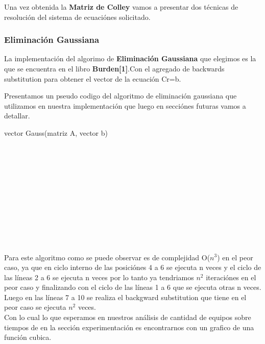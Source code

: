 Una vez obtenida la \textbf{Matriz de Colley} vamos a  presentar dos técnicas de resoluci\'on del sistema de ecuaci\'ones solicitado.\\

\subsubsection{Eliminación Gaussiana}
La implementación del algorimo de \textbf{Eliminación Gaussiana} que elegimos es la que se encuentra en el libro \textbf{Burden[1]}.Con el agregado de backwards substitution para 
obtener el vector de la ecuaci\'on Cr=b.

Presentamos un pseudo codigo del algoritmo de eliminaci\'on gaussiana que utilizamos en nuestra implementaci\'on que luego en secci\'ones futuras vamos a detallar.

\begin{algorithm}
    \begin{algorithmic}[1]\parskip=2mm
        \caption{vector Gauss(matriz A, vector b)}
        \\
        \\
        \\
        \\
        \\
        \\
        \\
        \\
        \\
        \\
    \end{algorithmic}
\end{algorithm}

Para este algoritmo como se puede observar es de complejidad O($n^3$) en el peor caso, ya que en ciclo interno de las posici\'ones 4 a 6 se ejecuta n veces
y el ciclo de las l\'ineas 2 a 6 se ejecuta n veces por lo tanto ya tendriamos $n^2$ iteraci\'ones en el peor caso y finalizando con el ciclo de las l\'ineas 1 a 6 que se ejecuta otras n veces.
Luego en las l\'ineas 7 a 10 se realiza el backgward substitution  que tiene en el peor caso se ejecuta $n^2$ veces.\\
Con lo cual lo que esperamos en nuestros an\'alisis de cantidad de equipos sobre tiempos de en la secci\'on experimentaci\'on es encontrarnos con un grafico de una funci\'on cubica.

